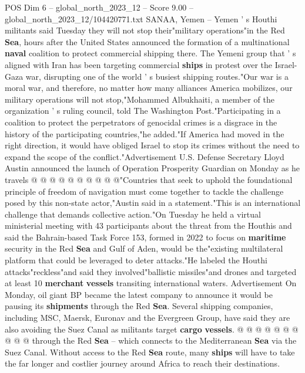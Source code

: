 \begin{textsample}{POS Dim 6 – global\_north\_2023\_12 – Score 9.00 – global\_north\_2023\_12/104420771.txt}  \label{ex:f6_pos_183}
SANAA, Yemen -- Yemen ' s Houthi militants said Tuesday they will not stop their"military operations"in the Red \textbf{Sea}, hours after the United States announced the formation of a multinational \textbf{naval} coalition to protect commercial shipping there.
The Yemeni group that ' s aligned with Iran has been targeting commercial \textbf{ships} in protest over the Israel-Gaza war, disrupting one of the world ' s busiest shipping routes."Our war is a moral war, and therefore, no matter how many alliances America mobilizes, our military operations will not stop,"Mohammed Albukhaiti, a member of the organization ' s ruling council, told The Washington Post."Participating in a coalition to protect the perpetrators of genocidal crimes is a disgrace in the history of the participating countries,"he added."If America had moved in the right direction, it would have obliged Israel to stop its crimes without the need to expand the scope of the conflict."Advertisement U.S.
Defense Secretary Lloyd Austin announced the launch of Operation Prosperity Guardian on Monday as he travels @ @ @ @ @ @ @ @ @ @"Countries that seek to uphold the foundational principle of freedom of navigation must come together to tackle the challenge posed by this non-state actor,"Austin said in a statement."This is an international challenge that demands collective action."On Tuesday he held a virtual ministerial meeting with 43 participants about the threat from the Houthis and said the Bahrain-based Task Force 153, formed in 2022 to focus on \textbf{maritime} security in the Red \textbf{Sea} and Gulf of Aden, would be the"existing multilateral platform that could be leveraged to deter attacks."He labeled the Houthi attacks"reckless"and said they involved"ballistic missiles"and drones and targeted at least 10 \textbf{merchant} \textbf{vessels} transiting international waters.
Advertisement On Monday, oil giant BP became the latest company to announce it would be pausing its \textbf{shipments} through the Red \textbf{Sea}.
Several shipping companies, including MSC, Maersk, Euronav and the Evergreen Group, have said they are also avoiding the Suez Canal as militants target \textbf{cargo} \textbf{vessels}. @ @ @ @ @ @ @ @ @ @ through the Red \textbf{Sea} -- which connects to the Mediterranean \textbf{Sea} via the Suez Canal.
Without access to the Red \textbf{Sea} route, many \textbf{ships} will have to take the far longer and costlier journey around Africa to reach their destinations.

\end{textsample}
